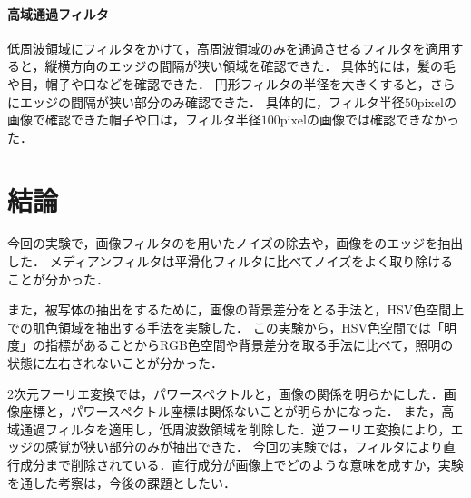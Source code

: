 \paragraph{高域通過フィルタ}
低周波領域にフィルタをかけて，高周波領域のみを通過させるフィルタを適用すると，縦横方向のエッジの間隔が狭い領域を確認できた．
具体的には，髪の毛や目，帽子や口などを確認できた．
円形フィルタの半径を大きくすると，さらにエッジの間隔が狭い部分のみ確認できた．
具体的に，フィルタ半径\(50\textrm{pixel}\)の画像で確認できた帽子や口は，フィルタ半径\(100\textrm{pixel}\)の画像では確認できなかった．
\section{結論}
今回の実験で，画像フィルタのを用いたノイズの除去や，画像をのエッジを抽出した．
メディアンフィルタは平滑化フィルタに比べてノイズをよく取り除けることが分かった．\par
また，被写体の抽出をするために，画像の背景差分をとる手法と，HSV色空間上での肌色領域を抽出する手法を実験した．
この実験から，HSV色空間では「明度」の指標があることからRGB色空間や背景差分を取る手法に比べて，照明の状態に左右されないことが分かった．\par
2次元フーリエ変換では，パワースペクトルと，画像の関係を明らかにした．画像座標と，パワースペクトル座標は関係ないことが明らかになった．
また，高域通過フィルタを適用し，低周波数領域を削除した．逆フーリエ変換により，エッジの感覚が狭い部分のみが抽出できた．
今回の実験では，フィルタにより直行成分まで削除されている．直行成分が画像上でどのような意味を成すか，実験を通した考察は，今後の課題としたい．